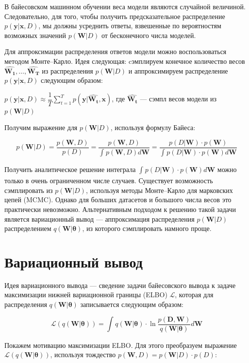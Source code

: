 \documentclass{article}
\begin{document}
В байесовском машинном обучении веса модели являются случайной величиной. Следовательно, для того,
чтобы получить предсказательное распределение $p(\mathbf{y} | \mathbf{x}, D)$, мы должны усреднить ответы,
взвешенные по вероятностям возможных значений $p(\mathbf{W} | D)$ от бесконечного числа моделей.

Для аппроксимации распределения ответов модели можно воспользоваться методом Монте--Карло. Идея следующая: cэмплируем конечное количество весов $\hat{\mathbf{W_1}}, \dots, \hat{\mathbf{W_T}}$ из распределения $p(\mathbf{W}| D)$  и аппроксимируем распределение $p(\mathbf{y} | \mathbf{x}, D)$ следующим образом:

$
p(\mathbf{y} | \mathbf{x}, D)
\approx \dfrac{1}{T} \sum_{t=1}^{T}{p(\mathbf{y} | \hat{\mathbf{W_t}}, \mathbf{x})}
$, где $\hat{\mathbf{W_t}}$ --- сэмпл весов модели из $p(\mathbf{W}| D)$

Получим выражение для $p(\mathbf{W}| D)$, используя формулу Байеса:

\[
p(\mathbf{W}| D) =
\dfrac{p(\mathbf{W}, D)}{p(D)} =
\dfrac{p(\mathbf{W}, D)}{\int_{}{} p(\mathbf{W}, D) d\mathbf{W}} =
\dfrac{p(D | \mathbf{W}) \cdot p(\mathbf{W})}{\int_{}{} p(D | \mathbf{W}) \cdot p(\mathbf{W}) d\mathbf{W}}
\]

Получить аналитическое решение интеграла $\int_{}{} p(D | \mathbf{W}) \cdot p(\mathbf{W}) d\mathbf{W}$ можно только в очень ограниченном числе случаев. Существует возможность сэмплировать из $p(\mathbf{W}| D)$, используя методы Монте--Карло для марковских цепей (MCMC). Однако для больших датасетов и большого числа весов это практически невозможно. Альтернативным подходом к решению такой задачи является вариационный вывод --- аппроксимация распределения $p(\mathbf{W}| D)$ распределением $q(\mathbf{W} | \pmb{\theta})$, из которого сэмплировать намного проще.


\section{Вариационный вывод}
Идея вариационного вывода --- сведение задачи байесовского вывода к задаче максимизации нижней вариационной границы (ELBO) $\mathcal{L}$, которая для распределения $q(\mathbf{W} | \pmb{\theta})$ записывается следующим образом:

\[
\mathcal{L}(q(\mathbf{W} | \pmb{\theta})) =
\int_{}{} q(\mathbf{W} | \pmb{\theta}) \cdot \ln{\dfrac{p(\mathbf{D}, \mathbf{W})}{q(\mathbf{W} | \pmb{\theta})}} d\mathbf{W}
\]

Покажем мотивацию максимизации ELBO. Для этого преобразуем выражение $\mathcal{L}(q(\mathbf{W} | \pmb{\theta}))$, используя тождество $p(\mathbf{W}, D) = p(\mathbf{W}| D)\cdot p(D)$:
\end{document}
